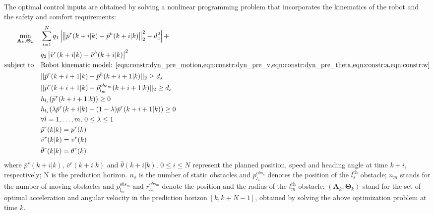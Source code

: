 \documentclass[letterpaper, 10 pt, conference]{ieeeconf}
\begin{document}
	The optimal control inputs are obtained by solving a nonlinear programming problem that incorporates the kinematics of the robot and the safety and comfort requirements:
	\begin{subequations}\label{eqn:path_plan_mpc}
		\begin{align}
			\min_{\mathbf{A}_k,\mathbf{\Theta}_k} \quad &\sum\limits_{i=1}^{N} q_1\left| \left\|\bar{p}^r(k+i|k)-\tilde{p}^h(k+i|k)\right\|^2_2-d^2_{c}\right| + \notag\\
			& q_2\left|\bar{v}^r(k+i|k)-\tilde{v}^h(k+i|k)\right|^2\label{eqn:obj}\\
			\text{subject to} \quad & \text{Robot kinematic model: \cref{eqn:constr:dyn_pre_motion,eqn:constr:dyn_pre_v,eqn:constr:dyn_pre_theta,eqn:constr:a,eqn:constr:w}}  \notag\\
			& ||\bar{p}^r(k+i+1|k)-\tilde{p}^h(k+i+1|k)||_2\geq d_s\label{eqn:constr:safety}\\
			& ||\bar{p}^r(k+i+1|k)-\tilde{p}^{obs_m}_{l_m}(k+i+1|k)||_2\geq d_s\label{eqn:constr:safety_mv_obs}\\
			& h_{l_s}(\bar{p}^r(k+i+1|k))\ge 0\label{eqn:constr:safety_s_obs1}\\
			& h_{l_s}(\lambda \bar{p}^r(k+i|k)+(1-\lambda)\bar{p}^r(k+i+1|k))\ge 0\label{eqn:constr:safety_s_obs2}\\
			& \forall l=1,\dots,m,\, 0\le \lambda\le 1\notag\\
			& \bar{p}^r(k|k)=p^r(k)\label{eqn:constr:init_z}\\
			& \bar{v}^r(k|k)=v^r(k)\label{eqn:constr:init_v}\\
			& \bar{\theta}^r(k|k)=\theta^r(k)\label{eqn:constr:init_theta}
		\end{align}
	\end{subequations}
	where $\bar{p}^r(k+i|k)$, $\bar{v}^r(k+i|k)$ and $\bar{\theta}(k+i|k),\, 0\le i\le N$ represent the planned position, speed and heading angle at time $k+i$, respectively;
	N is the prediction horizon.
	$n_s$ is the number of static obstacles and $p^{obs_s}_{l_s}$ denotes the position of the $l_s^{\text{th}}$ obstacle;
	$n_m$ stands for the number of moving obstacles and $p^{obs_m}_{l_m}$ and $r^{obs_m}_{l_m}$ denote the position and the radius of the $l_m^{\text{th}}$ obstacle;
	$(\mathbf{A}_k,\mathbf{\Theta}_k)$ stand for the set of optimal acceleration and angular velocity in the prediction  horizon $[k,k+N-1]$, obtained by solving the above optimization problem at time $k$.
	
\end{document}
